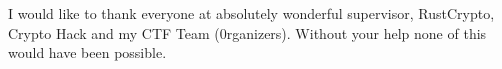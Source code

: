 I would like to thank everyone at absolutely wonderful supervisor,
RustCrypto, Crypto Hack and my CTF Team (0rganizers).
Without your help none of this would have been possible.
